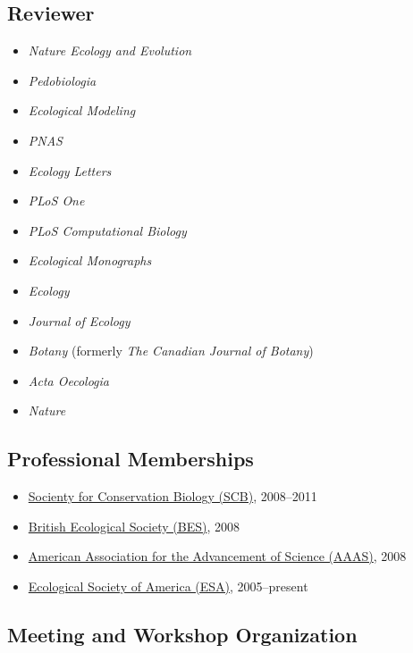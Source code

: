 \documentclass[a4paper]{article}
\begin{document}
\subsection{Reviewer}\label{article-reviewer}

\begin{itemize}
\item
  \emph{Nature Ecology and Evolution}
\item
  \emph{Pedobiologia}
\item
  \emph{Ecological Modeling}
\item
  \emph{PNAS}
\item
  \emph{Ecology Letters}
\item
  \emph{PLoS One}
\item
  \emph{PLoS Computational Biology}
\item
  \emph{Ecological Monographs}
\item
  \emph{Ecology}
\item
  \emph{Journal of Ecology}
\item
  \emph{Botany} (formerly \emph{The Canadian Journal of Botany})
\item
  \emph{Acta Oecologia}
\item
  \emph{Nature}
\end{itemize}

\subsection{Professional Memberships}\label{professional-memberships}

\begin{itemize}
\item
  \href{http://www.conbio.org/}{Socienty for Conservation Biology
  (SCB)}, 2008--2011
\item
  \href{http://www.aaas.org/}{British Ecological Society (BES)}, 2008
\item
  \href{http://www.aaas.org/}{American Association for the Advancement
  of Science (AAAS)}, 2008
\item
  \href{http://www.esa.org/}{Ecological Society of America (ESA)},
  2005--present
\end{itemize}

\subsection{Meeting and Workshop
Organization}\label{meeting-and-workshop-organization}
\end{document}
